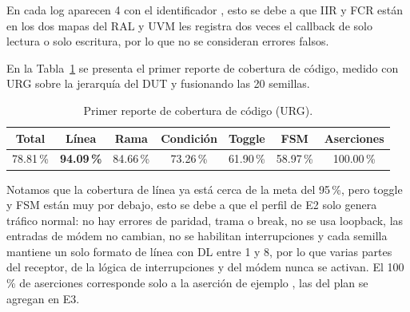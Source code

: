 \documentclass[11pt,a4paper]{article}
\newcommand{\cab}{\rowcolor{cabecera}}
\begin{document}
En cada log aparecen 4  con el identificador , esto se debe a que IIR y FCR están en los dos mapas del RAL y UVM les registra dos veces el callback de solo lectura o solo escritura, por lo que no se consideran errores falsos.

En la Tabla~\ref{tab:cobertura} se presenta el primer reporte de cobertura de código, medido con URG sobre la jerarquía del DUT y fusionando las 20 semillas.

\begin{table}[h]
\centering
\caption{Primer reporte de cobertura de código (URG).}
\label{tab:cobertura}
\begin{tabular}{|c|c|c|c|c|c|c|}
\hline
\cab \textbf{Total} & \textbf{Línea} & \textbf{Rama} & \textbf{Condición} & \textbf{Toggle} & \textbf{FSM} & \textbf{Aserciones} \\ \hline
78.81\,\% & \textbf{94.09\,\%} & 84.66\,\% & 73.26\,\% & 61.90\,\% & 58.97\,\% & 100.00\,\% \\ \hline
\end{tabular}
\end{table}

Notamos que la cobertura de línea ya está cerca de la meta del 95\,\%, pero toggle y FSM están muy por debajo, esto se debe a que el perfil de E2 solo genera tráfico normal: no hay errores de paridad, trama o break, no se usa loopback, las entradas de módem no cambian, no se habilitan interrupciones y cada semilla mantiene un solo formato de línea con DL entre 1 y 8, por lo que varias partes del receptor, de la lógica de interrupciones y del módem nunca se activan. El 100\,\% de aserciones corresponde solo a la aserción de ejemplo , las del plan se agregan en E3.

\end{document}
